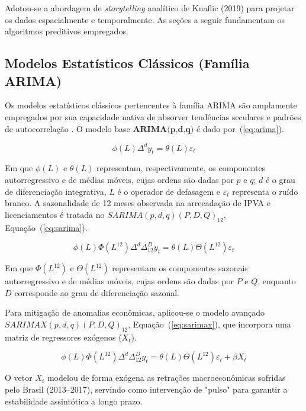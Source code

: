 \documentclass[12pt,a4paper]{article}
\begin{document}
Adotou-se a abordagem de \textit{storytelling} analítico de Knaflic (2019) para projetar os dados espacialmente e temporalmente. As seções a seguir fundamentam os algoritmos preditivos empregados. 

\subsection{Modelos Estatísticos Clássicos (Família ARIMA)}
Os modelos estatísticos clássicos pertencentes à família ARIMA são amplamente empregados por sua capacidade nativa de absorver tendências seculares e padrões de autocorrelação \cite{box1970time}. O modelo base $\textbf{ARIMA(p,d,q)}$ é dado por~(\ref{eq:arima}).

\begin{equation}
\phi(L)\Delta^{d} y_{t} = \theta(L)\varepsilon_{t}
\label{eq:arima}
\end{equation}

Em que $\phi(L)$ e $\theta(L)$ representam, respectivamente, os componentes autorregressivo e de médias móveis, cujas ordens são dadas por $p$ e $q$; $d$ é o grau de diferenciação integrativa, $L$ é o operador de defasagem e $\varepsilon_t$ representa o ruído branco. A sazonalidade de 12 meses observada na arrecadação de IPVA e licenciamentos é tratada no $SARIMA(p,d,q)(P,D,Q)_{12}$, Equação~(\ref{eq:sarima}).

\begin{equation}
\phi(L)\Phi(L^{12})\Delta^{d}\Delta_{12}^{D} y_{t} = \theta(L)\Theta(L^{12})\varepsilon_{t}
\label{eq:sarima}
\end{equation}

Em que $\Phi(L^{12})$ e $\Theta(L^{12})$ representam os componentes sazonais autorregressivo e de médias móveis, cujas ordens são dadas por $P$ e $Q$, enquanto $D$ corresponde ao grau de diferenciação sazonal.

Para mitigação de anomalias econômicas, aplicou-se o modelo avançado $SARIMAX(p,d,q)(P,D,Q)_{12}$, Equação~(\ref{eq:sarimax}), que incorpora uma matriz de regressores exógenos ($X_t$).

\begin{equation}
\phi(L)\Phi(L^{12})\Delta^{d}\Delta_{12}^{D} y_{t} = \theta(L)\Theta(L^{12})\varepsilon_{t} + \beta X_{t}
\label{eq:sarimax}
\end{equation}

O vetor $X_t$ modelou de forma exógena as retrações macroeconômicas sofridas pelo Brasil (2013--2017), servindo como intervenção de "pulso" para garantir a estabilidade assintótica a longo prazo.
\end{document}
